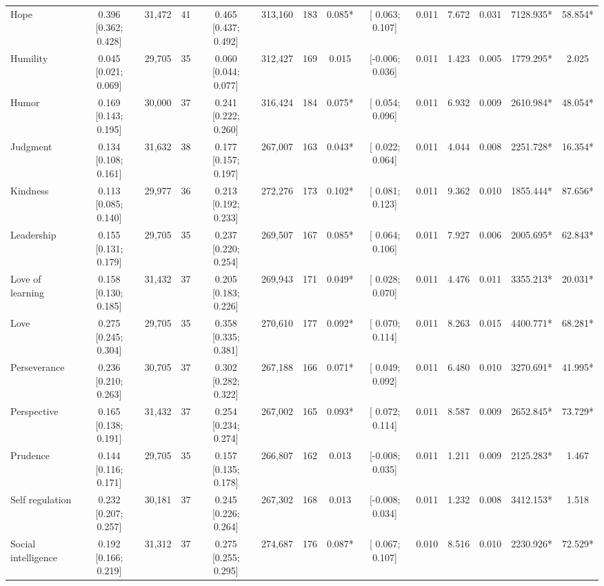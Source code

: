 \documentclass[
  man,floatsintext]{apa6}
\begin{document}
\begin{table}
{\begin{tabular}[t]{lccccccccccccc}
Hope & 0.396 [0.362; 0.428] & 31,472 & 41 & 0.465 [0.437; 0.492] & 313,160 & 183 & 0.085* & {}[ 0.063; 0.107] & 0.011 & 7.672 & 0.031 & 7128.935* & 58.854*\\
Humility & 0.045 [0.021; 0.069] & 29,705 & 35 & 0.060 [0.044; 0.077] & 312,427 & 169 & 0.015 & {}[-0.006; 0.036] & 0.011 & 1.423 & 0.005 & 1779.295* & 2.025\\
\addlinespace
Humor & 0.169 [0.143; 0.195] & 30,000 & 37 & 0.241 [0.222; 0.260] & 316,424 & 184 & 0.075* & {}[ 0.054; 0.096] & 0.011 & 6.932 & 0.009 & 2610.984* & 48.054*\\
Judgment & 0.134 [0.108; 0.161] & 31,632 & 38 & 0.177 [0.157; 0.197] & 267,007 & 163 & 0.043* & {}[ 0.022; 0.064] & 0.011 & 4.044 & 0.008 & 2251.728* & 16.354*\\
Kindness & 0.113 [0.085; 0.140] & 29,977 & 36 & 0.213 [0.192; 0.233] & 272,276 & 173 & 0.102* & {}[ 0.081; 0.123] & 0.011 & 9.362 & 0.010 & 1855.444* & 87.656*\\
Leadership & 0.155 [0.131; 0.179] & 29,705 & 35 & 0.237 [0.220; 0.254] & 269,507 & 167 & 0.085* & {}[ 0.064; 0.106] & 0.011 & 7.927 & 0.006 & 2005.695* & 62.843*\\
Love of learning & 0.158 [0.130; 0.185] & 31,432 & 37 & 0.205 [0.183; 0.226] & 269,943 & 171 & 0.049* & {}[ 0.028; 0.070] & 0.011 & 4.476 & 0.011 & 3355.213* & 20.031*\\
\addlinespace
Love & 0.275 [0.245; 0.304] & 29,705 & 35 & 0.358 [0.335; 0.381] & 270,610 & 177 & 0.092* & {}[ 0.070; 0.114] & 0.011 & 8.263 & 0.015 & 4400.771* & 68.281*\\
Perseverance & 0.236 [0.210; 0.263] & 30,705 & 37 & 0.302 [0.282; 0.322] & 267,188 & 166 & 0.071* & {}[ 0.049; 0.092] & 0.011 & 6.480 & 0.010 & 3270.691* & 41.995*\\
Perspective & 0.165 [0.138; 0.191] & 31,432 & 37 & 0.254 [0.234; 0.274] & 267,002 & 165 & 0.093* & {}[ 0.072; 0.114] & 0.011 & 8.587 & 0.009 & 2652.845* & 73.729*\\
Prudence & 0.144 [0.116; 0.171] & 29,705 & 35 & 0.157 [0.135; 0.178] & 266,807 & 162 & 0.013 & {}[-0.008; 0.035] & 0.011 & 1.211 & 0.009 & 2125.283* & 1.467\\
Self regulation & 0.232 [0.207; 0.257] & 30,181 & 37 & 0.245 [0.226; 0.264] & 267,302 & 168 & 0.013 & {}[-0.008; 0.034] & 0.011 & 1.232 & 0.008 & 3412.153* & 1.518\\
\addlinespace
Social intelligence & 0.192 [0.166; 0.219] & 31,312 & 37 & 0.275 [0.255; 0.295] & 274,687 & 176 & 0.087* & {}[ 0.067; 0.107] & 0.010 & 8.516 & 0.010 & 2230.926* & 72.529*\\

\end{tabular}}
\end{table}
\end{document}

